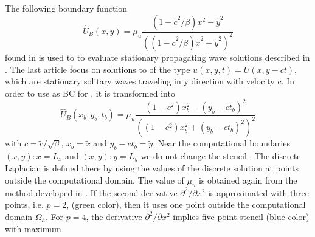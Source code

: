 \documentclass[11pt,a4paper,twoside]{article}
\begin{document}
The following boundary function
\begin{equation}\label{eqBCV}
\widehat U_B(x , y) = \mu_u \frac{ (1 - \tilde c^2/\beta) x^2 - \tilde y^2}{( (1 - \tilde c^2/\beta) \tilde x^2 + \tilde y^2)^2}
\end{equation}
found in \cite{BoundaryProblem} is used to to evaluate stationary propagating wave solutions described in \cite{EllipticProblem}. The last article focus on solutions to  of the type $u(x, y, t) = U(x, y - ct)$, which are stationary solitary waves traveling in y direction
with velocity c. In order to use  as BC for , it is transformed into
\begin{equation}\label{eqBCH}
\widehat U_B(x_b , y_b, t_b) = \mu_u \frac{ (1 - c^2) x_b^2 - (y_b-ct_b)^2}{( (1 - c^2) x_b^2 + (y_b-ct_b)^2)^2}
\end{equation}
with $c = \tilde c / \sqrt{\beta}$, $x_b = \tilde x$ and $y_b - ct_b = \tilde y$. 
Near the computational boundaries $(x,y):x=L_x$ and $(x,y):y=L_y$ we do not change the stencil . The discrete Laplacian
is defined there by using the values of the discrete solution  at points outside the computational domain. The value of $\mu_u$ is obtained again from the method developed in \cite{BoundaryProblem}. If the second derivative $\partial^2 / \partial x^2$ is approximated with three points, i.e. $p=2$, (green color), then it uses one point outside the computational domain $\Omega_h$. For $p=4$, the derivative $\partial^2 / \partial x^2$ implies five point stencil (blue color) with maximum
\end{document}
